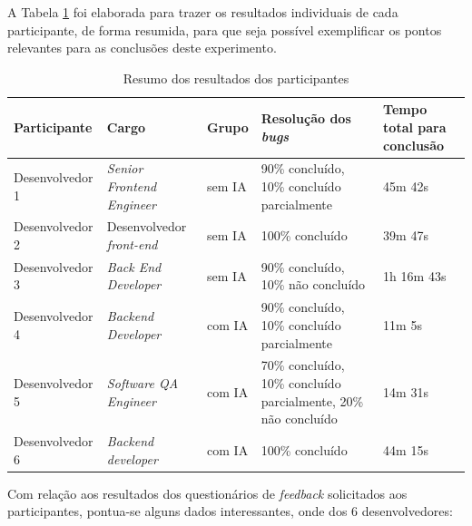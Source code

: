 \documentclass[english,brazilian]{UNISINOSartigo} %
\begin{document}
A Tabela \ref{tab:resumo_resultados_participantes} foi elaborada para trazer os resultados individuais de cada participante, de forma resumida, para que seja possível exemplificar os pontos relevantes para as conclusões deste experimento.

\begin{table}[ht]
    \caption{Resumo dos resultados dos participantes}
    \label{tab:resumo_resultados_participantes}
    \centering%
    \footnotesize
    \begin{tabularx}{\textwidth}{XXXXX}
        \toprule
        \textbf{Participante} & \textbf{Cargo} & \textbf{Grupo} & \textbf{Resolução dos \textit{bugs}} & \textbf{Tempo total para conclusão} \\
        \midrule
        Desenvolvedor 1 & \textit{Senior Frontend Engineer} & sem IA & 90\% concluído, 10\% concluído parcialmente & 45m 42s \\
        \midrule
        Desenvolvedor 2 & Desenvolvedor \textit{front-end} & sem IA & 100\% concluído & 39m 47s \\
        \midrule
        Desenvolvedor 3 & \textit{Back End Developer} & sem IA & 90\% concluído, 10\% não concluído & 1h 16m 43s \\
        \midrule
        Desenvolvedor 4 & \textit{Backend Developer} & com IA & 90\% concluído, 10\% concluído parcialmente & 11m 5s \\
        \midrule
        Desenvolvedor 5 & \textit{Software QA Engineer} & com IA & 70\% concluído, 10\% concluído parcialmente, 20\% não concluído & 14m 31s \\
        \midrule
        Desenvolvedor 6 & \textit{Backend developer} & com IA & 100\% concluído & 44m 15s \\
        \bottomrule
    \end{tabularx}
\end{table}
\FloatBarrier

Com relação aos resultados dos questionários de \textit{feedback} solicitados aos participantes, pontua-se alguns dados interessantes, onde dos 6 desenvolvedores:
\end{document}
